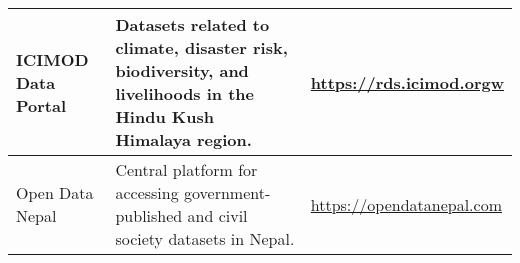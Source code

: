 \begin{table}[h!]
\begin{tabular}{|p{3cm}|p{6cm}|p{5cm}|}
\hline
ICIMOD Data Portal & Datasets related to climate, disaster risk, biodiversity, and livelihoods in the Hindu Kush Himalaya region. & \url{https://rds.icimod.orgw} \\
\hline
Open Data Nepal & Central platform for accessing government-published and civil society datasets in Nepal. & \url{https://opendatanepal.com} \\
\hline
\end{tabular}
\end{table}

\clearpage
